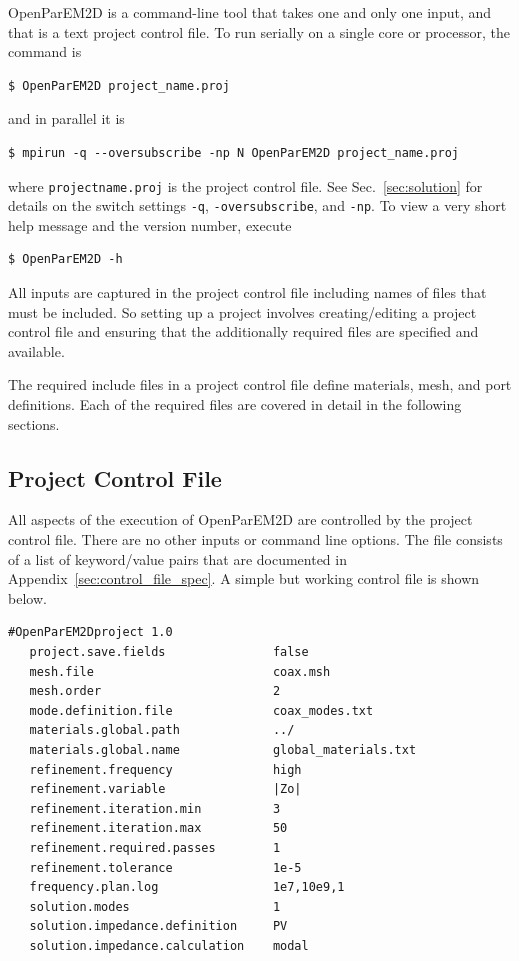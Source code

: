 \documentclass[titlepage]{article}
\renewcommand\_{\textunderscore\linebreak[1]}
\begin{document}
OpenParEM2D is a command-line tool that takes one and only one input, and that is a text project control file.  To run serially on a single core or processor, the command is
\begin{Verbatim}[fontsize=\small]
   $ OpenParEM2D project_name.proj
\end{Verbatim}
and in parallel it is
\begin{Verbatim}[fontsize=\small]
   $ mpirun -q --oversubscribe -np N OpenParEM2D project_name.proj
\end{Verbatim}
where \texttt{project\_name.proj} is the project control file.  See Sec.~\ref{sec:solution} for details on the switch settings \texttt{-q}, \texttt{-oversubscribe}, and \texttt{-np}. To view a very short help message and the version number, execute
\begin{Verbatim}[fontsize=\small]
   $ OpenParEM2D -h
\end{Verbatim}

All inputs are captured in the project control file including names of files that must be included. So setting up a project involves creating/editing a project control file and ensuring that the additionally required files are specified and available.

The required include files in a project control file define materials, mesh, and port definitions. Each of the required files are covered in detail in the following sections.

\subsection{Project Control File}

All aspects of the execution of OpenParEM2D are controlled by the project control file.  There are no other inputs or command line options.  The file consists of a list of keyword/value pairs that are documented in Appendix~\ref{sec:control_file_spec}.  A simple but working control file is shown below.

\begin{Verbatim}[fontsize=\small]
   #OpenParEM2Dproject 1.0
   project.save.fields               false
   mesh.file                         coax.msh
   mesh.order                        2
   mode.definition.file              coax_modes.txt
   materials.global.path             ../
   materials.global.name             global_materials.txt
   refinement.frequency              high
   refinement.variable               |Zo|
   refinement.iteration.min          3
   refinement.iteration.max          50
   refinement.required.passes        1
   refinement.tolerance              1e-5
   frequency.plan.log                1e7,10e9,1
   solution.modes                    1
   solution.impedance.definition     PV
   solution.impedance.calculation    modal
\end{Verbatim}
\end{document}
